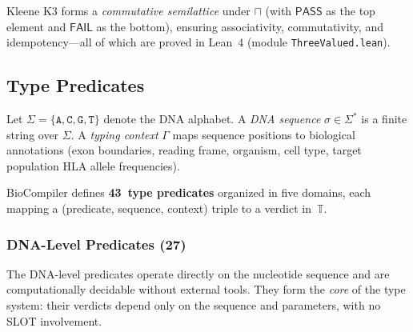 \documentclass[acmsmall,review,anonymous]{acmart}
\newcommand{\PASS}{\ensuremath{\mathsf{PASS}}\xspace}
\newcommand{\FAIL}{\ensuremath{\mathsf{FAIL}}\xspace}
\newcommand{\tvl}{\mathbb{T}}
\newcommand{\seq}{\sigma}
\begin{document}
\noindent Kleene K3 forms a \emph{commutative semilattice} under
$\sqcap$ (with \PASS{} as the top element and \FAIL{} as the bottom),
ensuring associativity, commutativity, and idempotency---all of which
are proved in Lean~4 (module \texttt{ThreeValued.lean}).

\subsection{Type Predicates}\label{sec:predicates}

Let $\Sigma = \{\texttt{A}, \texttt{C}, \texttt{G}, \texttt{T}\}$
denote the DNA alphabet.
A \emph{DNA sequence} $\seq \in \Sigma^*$ is a finite string over
$\Sigma$.
A \emph{typing context} $\Gamma$ maps sequence positions to biological
annotations (exon boundaries, reading frame, organism, cell type,
target population HLA allele frequencies).

BioCompiler defines \textbf{43~type predicates} organized in five
domains, each mapping a (predicate, sequence, context) triple to a
verdict in~$\tvl$.

\subsubsection{DNA-Level Predicates (27)}

The DNA-level predicates operate directly on the nucleotide sequence
and are computationally decidable without external tools.
They form the \emph{core} of the type system: their verdicts depend
only on the sequence and parameters, with no SLOT involvement.
\end{document}
